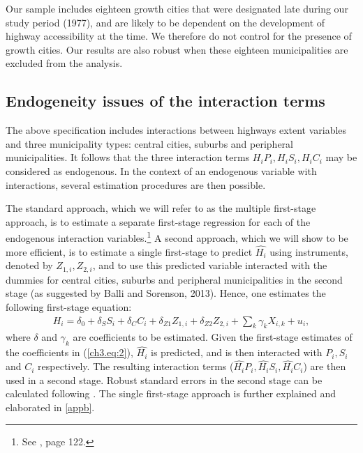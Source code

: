 \documentclass[a4paper,authoryear,review]{elsarticle}  	%
\begin{document}
	Our sample includes eighteen growth cities that were designated late during our study period (1977), and are likely to be dependent on the development of highway accessibility at the time. We therefore do not control for the presence of growth cities. Our results are also robust when these eighteen municipalities are excluded from the analysis.

\subsection{Endogeneity issues of the interaction terms}
	The above specification includes interactions between highways extent variables and three municipality types: central cities, suburbs and peripheral municipalities. It follows that the three interaction terms $H_{i}P_{i}, H_{i}S_{i}, H_{i}C_{i}$ may be considered as endogenous. In the context of an endogenous variable with interactions, several estimation procedures are then possible.
	
	The standard approach, which we will refer to as the multiple first-stage approach, is to estimate a separate first-stage regression for each of the endogenous interaction variables.\footnote{See \citet{Wooldridge2002}, page 122.} A second approach, which we will show to be more efficient, is to estimate a single first-stage to predict $\hat{H_i}$ using instruments, denoted by $Z_{1,i}, Z_{2,i}$, and to use this predicted variable interacted with the dummies for central cities, suburbs and peripheral municipalities in the second stage (as suggested by Balli and Sorenson, 2013). Hence, one estimates the following first-stage equation:	
	\begin{equation}\label{ch3.eq:2}
		\begin{split}
		H_{i}=\delta_0 + \delta_{S}S_{i} + \delta_{C}C_{i} + \delta_{Z1}Z_{1,i} + \delta_{Z2}Z_{2,i} + \sum_{k}\gamma_{k} X_{i,k} + u_i ,
		\end{split}		 	
	\end{equation}
	where $\delta$ and $\gamma_k$ are coefficients to be estimated. Given the first-stage estimates of the coefficients in (\ref{ch3.eq:2}), $\hat{H_i}$ is predicted, and is then interacted with $P_i, S_i$ and $C_i$ respectively. The resulting interaction terms ($\widehat{H_{i}}P_i,\widehat{H_{i}}S_i,\widehat{H_{i}}C_i$) are then used in a second stage. Robust standard errors in the second stage can be calculated following \citet{Angrist2008}.
	The single first-stage approach is further explained and elaborated in \ref{appb}.
		
\end{document}
